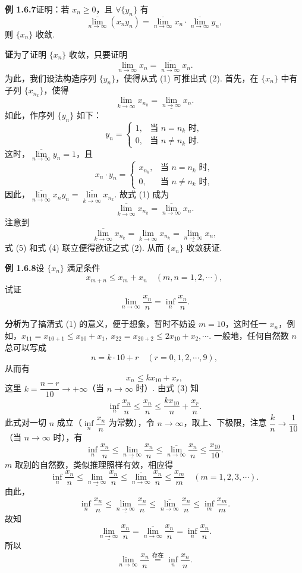 \documentclass[UTF8, 12pt, fontset=fandol, oneside]{ctexart}
\begin{document}
\noindent\textbf{例 1.6.7}\quad 证明：若 $x_n\ge0$，且 $\forall\{y_n\}$ 有
\[
  \overline{\lim_{n\to\infty}}(x_ny_n)
  =\overline{\lim_{n\to\infty}}x_n\cdot\overline{\lim_{n\to\infty}}y_n,
\tag{1}
\]
则 $\{x_n\}$ 收敛.

\noindent\textbf{证}\quad 为了证明 $\{x_n\}$ 收敛，只要证明
\[
  \lim_{n\to\infty}x_n=\overline{\lim_{n\to\infty}}x_n.
\tag{2}
\]
为此，我们设法构造序列 $\{y_n\}$，使得从式 (1) 可推出式 (2). 首先，在 $\{x_n\}$ 中有子列 $\{x_{n_k}\}$，使得
\[
  \lim_{k\to\infty}x_{n_k}=\underline{\lim_{n\to\infty}}x_n.
\tag{3}
\]
如此，作序列 $\{y_n\}$ 如下：
\[
  y_n=
  \begin{cases}
    1, & \text{当 }n=n_k\text{ 时},\\
    0, & \text{当 }n\ne n_k\text{ 时}.
  \end{cases}
\]
这时，$\overline{\lim\limits_{n\to\infty}}y_n=1$，且
\[
  x_n\cdot y_n=
  \begin{cases}
    x_{n_k}, & \text{当 }n=n_k\text{ 时},\\
    0, & \text{当 }n\ne n_k\text{ 时},
  \end{cases}
\]
因此，$\overline{\lim\limits_{n\to\infty}}x_ny_n=\overline{\lim\limits_{k\to\infty}}x_{n_k}$. 故式 (1) 成为
\[
  \overline{\lim_{k\to\infty}}x_{n_k}
  =\overline{\lim_{n\to\infty}}x_n.
\tag{4}
\]
注意到
\[
  \overline{\lim_{k\to\infty}}x_{n_k}
  =\lim_{k\to\infty}x_{n_k}
  =\underline{\lim_{n\to\infty}}x_n,
\tag{5}
\]
式 (5) 和式 (4) 联立便得欲证之式 (2). 从而 $\{x_n\}$ 收敛获证.

\noindent\textbf{例 1.6.8}\quad 设 $\{x_n\}$ 满足条件
\[
  x_{m+n}\le x_m+x_n\quad(m,n=1,2,\cdots),
\tag{1}
\]
试证
\[
  \lim_{n\to\infty}\frac{x_n}{n}=\inf_n\frac{x_n}{n}.
\]

\noindent\textbf{分析}\quad 为了搞清式 (1) 的意义，便于想象，暂时不妨设 $m=10$，这时任一 $x_n$，例如，$x_{11}=x_{10+1}\le x_{10}+x_1,\ x_{22}=x_{20+2}\le2x_{10}+x_2,\cdots$. 一般地，任何自然数 $n$ 总可以写成
\[
  n=k\cdot10+r\quad(r=0,1,2,\cdots,9),
\tag{2}
\]
从而有
\[
  x_n\le kx_{10}+x_r,
\tag{3}
\]
这里 $k=\dfrac{n-r}{10}\to+\infty$（当 $n\to\infty$ 时）. 由式 (3) 知
\[
  \inf_n\frac{x_n}{n}\le \frac{x_n}{n}\le \frac{kx_{10}}{n}+\frac{x_r}{n}.
\]
此式对一切 $n$ 成立（$\inf\limits_n\dfrac{x_n}{n}$ 为常数），令 $n\to\infty$，取上、下极限，注意 $\dfrac{k}{n}\to\dfrac1{10}$（当 $n\to\infty$ 时），有
\[
  \inf_n\frac{x_n}{n}\le \underline{\lim_{n\to\infty}}\frac{x_n}{n}
  \le \overline{\lim_{n\to\infty}}\frac{x_n}{n}\le \frac{x_{10}}{10}.
\]
$m$ 取别的自然数，类似推理照样有效，相应得
\[
  \inf_n\frac{x_n}{n}\le \underline{\lim_{n\to\infty}}\frac{x_n}{n}
  \le \overline{\lim_{n\to\infty}}\frac{x_n}{n}\le \frac{x_m}{m}\quad(m=1,2,3,\cdots).
\]
由此，
\[
  \inf_n\frac{x_n}{n}\le \underline{\lim_{n\to\infty}}\frac{x_n}{n}
  \le \overline{\lim_{n\to\infty}}\frac{x_n}{n}\le \inf_m\frac{x_m}{m}.
\]
故知
\[
  \underline{\lim_{n\to\infty}}\frac{x_n}{n}
  =\overline{\lim_{n\to\infty}}\frac{x_n}{n}
  =\inf_n\frac{x_n}{n}.
\]
所以
\[
  \lim_{n\to\infty}\frac{x_n}{n}\overset{\text{存在}}{=}\inf_n\frac{x_n}{n}.
\]
\end{document}
